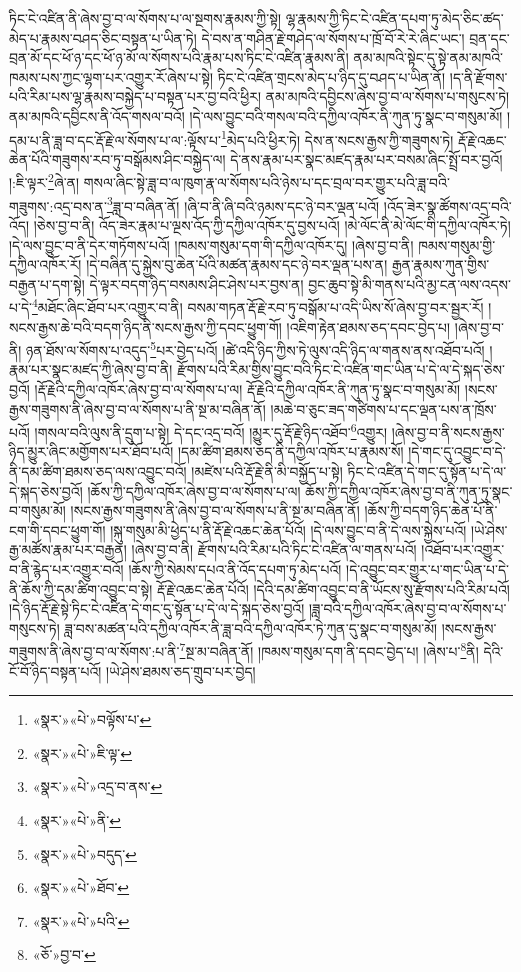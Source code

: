 ཏིང་ངེ་འཛིན་ནི་ཞེས་བྱ་བ་ལ་སོགས་པ་ལ་སྔགས་རྣམས་ཀྱི་སྟེ། ལྷ་རྣམས་ཀྱི་ཏིང་ངེ་འཛིན་དཔག་ཏུ་མེད་ཅིང་ཚད་མེད་པ་རྣམས་བཤད་ཅིང་བསྟན་པ་ཡིན་ཏེ། དེ་བས་ན་གཤིན་རྗེ་གཤེད་ལ་སོགས་པ་ཁྲོ་བོ་རེ་རེ་ཞིང་ཡང་། བྲན་དང་བྲན་མོ་དང་ཕོ་ཉ་དང་ཕོ་ཉ་མོ་ལ་སོགས་པའི་རྣམ་པས་ཏིང་ངེ་འཛིན་རྣམས་ནི། ནམ་མཁའི་སྟེང་དུ་སྟེ་ནམ་མཁའི་ཁམས་པས་ཀྱང་ལྷག་པར་འགྱུར་རོ་ཞེས་པ་སྟེ། ཏིང་ངེ་འཛིན་གྲངས་མེད་པ་ཉིད་དུ་བཤད་པ་ཡིན་ནོ། །ད་ནི་རྫོགས་པའི་རིམ་པས་ལྷ་རྣམས་བསྐྱེད་པ་བསྟན་པར་བྱ་བའི་ཕྱིར། ནམ་མཁའི་དབྱིངས་ཞེས་བྱ་བ་ལ་སོགས་པ་གསུངས་ཏེ། ནམ་མཁའི་དབྱིངས་ནི་འོད་གསལ་བའོ། །དེ་ལས་བྱུང་བའི་གསལ་བའི་དཀྱིལ་འཁོར་ནི་ཀུན་ཏུ་སྣང་བ་གསུམ་མོ། །དམ་པ་ནི་ཟླ་བ་དང་རྡོ་རྗེ་ལ་སོགས་པ་ལ་:ལྟོས་པ་\footnote{«སྣར་»«པེ་»བལྟོས་པ་}མེད་པའི་ཕྱིར་ཏེ། དེས་ན་སངས་རྒྱས་ཀྱི་གཟུགས་ཏེ། རྡོ་རྗེ་འཆང་ཆེན་པོའི་གཟུགས་རབ་ཏུ་བསྒོམས་ཤིང་བསྐྱེད་ལ། དེ་ནས་རྣམ་པར་སྣང་མཛད་རྣམ་པར་བསམ་ཞིང་སྤྲོ་བར་བྱའོ། །:ཇི་ལྟར་\footnote{«སྣར་»«པེ་»ཇི་ལྟ་}ཞེ་ན། གསལ་ཞིང་སྟེ་ཟླ་བ་ལ་ཁུག་རྣ་ལ་སོགས་པའི་ཉེས་པ་དང་བྲལ་བར་གྱུར་པའི་ཟླ་བའི་གཟུགས་:འདྲ་བས་ན་\footnote{«སྣར་»«པེ་»འདྲ་བ་ནས་}ཟླ་བ་བཞིན་ནོ། །ཞི་བ་ནི་ཞི་བའི་ཉམས་དང་ཉེ་བར་ལྡན་པའོ། །འོད་ཟེར་སྣ་ཚོགས་འདྲ་བའི་འོད། །ཅེས་བྱ་བ་ནི། འོད་ཟེར་རྣམ་པ་ལྔས་འོད་ཀྱི་དཀྱིལ་འཁོར་དུ་བྱས་པའོ། །མེ་ལོང་ནི་མེ་ལོང་གི་དཀྱིལ་འཁོར་ཏེ། །དེ་ལས་བྱུང་བ་ནི་དེར་གཏོགས་པའོ། །ཁམས་གསུམ་དག་གི་དཀྱིལ་འཁོར་དུ། །ཞེས་བྱ་བ་ནི། ཁམས་གསུམ་གྱི་དཀྱིལ་འཁོར་རོ། །དེ་བཞིན་དུ་སྐྱེས་བུ་ཆེན་པོའི་མཚན་རྣམས་དང་ཉེ་བར་ལྡན་པས་ན། རྒྱན་རྣམས་ཀུན་གྱིས་བརྒྱན་པ་དག་སྟེ། དེ་ལྟར་བདག་ཉིད་བསམས་ཤིང་ཤེས་པར་བྱས་ན། བྱང་ཆུབ་སྟེ་མི་གནས་པའི་མྱ་ངན་ལས་འདས་པ་དེ་\footnote{«སྣར་»«པེ་»ནི་}མཐོང་ཞིང་ཐོབ་པར་འགྱུར་བ་ནི། བསམ་གཏན་རྡོ་རྗེ་རབ་ཏུ་བསྒོམ་པ་འདི་ཡིས་སོ་ཞེས་བྱ་བར་སྦྱར་རོ། །སངས་རྒྱས་ཆེ་བའི་བདག་ཉིད་ནི་སངས་རྒྱས་ཀྱི་དབང་ཕྱུག་གོ། །འཇིག་རྟེན་ཐམས་ཅད་དབང་བྱེད་པ། །ཞེས་བྱ་བ་ནི། ཉན་ཐོས་ལ་སོགས་པ་འདུད་\footnote{«སྣར་»«པེ་»བདུད་}པར་བྱེད་པའོ། །ཚེ་འདི་ཉིད་ཀྱིས་ཏེ་ལུས་འདི་ཉིད་ལ་གནས་ནས་འཐོབ་པའོ། །རྣམ་པར་སྣང་མཛད་ཀྱི་ཞེས་བྱ་བ་ནི། རྫོགས་པའི་རིམ་གྱིས་བྱུང་བའི་ཏིང་ངེ་འཛིན་གང་ཡིན་པ་དེ་ལ་དེ་སྐད་ཅེས་བྱའོ། །རྡོ་རྗེའི་དཀྱིལ་འཁོར་ཞེས་བྱ་བ་ལ་སོགས་པ་ལ། རྡོ་རྗེའི་དཀྱིལ་འཁོར་ནི་ཀུན་ཏུ་སྣང་བ་གསུམ་མོ། །སངས་རྒྱས་གཟུགས་ནི་ཞེས་བྱ་བ་ལ་སོགས་པ་ནི་སྔ་མ་བཞིན་ནོ། །མཆེ་བ་ཅུང་ཟད་གཙིགས་པ་དང་ལྡན་པས་ན་ཁྲོས་པའོ། །གསལ་བའི་ལུས་ནི་དྲུག་པ་སྟེ། དེ་དང་འདྲ་བའོ། །མྱུར་དུ་རྡོ་རྗེ་ཉིད་འཐོབ་\footnote{«སྣར་»«པེ་»ཐོབ་}འགྱུར། །ཞེས་བྱ་བ་ནི་སངས་རྒྱས་ཉིད་མྱུར་ཞིང་མགྱོགས་པར་ཐོབ་པའོ། །དམ་ཚིག་ཐམས་ཅད་ནི་དཀྱིལ་འཁོར་པ་རྣམས་སོ། །དེ་གང་དུ་འབྱུང་བ་དེ་ནི་དམ་ཚིག་ཐམས་ཅད་ལས་འབྱུང་བའོ། །མཛེས་པའི་རྡོ་རྗེ་ནི་མི་བསྐྱོད་པ་སྟེ། ཏིང་ངེ་འཛིན་དེ་གང་དུ་སྟོན་པ་དེ་ལ་དེ་སྐད་ཅེས་བྱའོ། །ཆོས་ཀྱི་དཀྱིལ་འཁོར་ཞེས་བྱ་བ་ལ་སོགས་པ་ལ། ཆོས་ཀྱི་དཀྱིལ་འཁོར་ཞེས་བྱ་བ་ནི་ཀུན་ཏུ་སྣང་བ་གསུམ་མོ། །སངས་རྒྱས་གཟུགས་ནི་ཞེས་བྱ་བ་ལ་སོགས་པ་ནི་སྔ་མ་བཞིན་ནོ། །ཆོས་ཀྱི་བདག་ཉིད་ཆེན་པོ་ནི་ངག་གི་དབང་ཕྱུག་གོ། །སྐུ་གསུམ་མི་ཕྱེད་པ་ནི་རྡོ་རྗེ་འཆང་ཆེན་པོའོ། །དེ་ལས་བྱུང་བ་ནི་དེ་ལས་སྐྱེས་པའོ། །ཡེ་ཤེས་རྒྱ་མཚོས་རྣམ་པར་བརྒྱན། །ཞེས་བྱ་བ་ནི། རྫོགས་པའི་རིམ་པའི་ཏིང་ངེ་འཛིན་ལ་གནས་པའོ། །འཐོབ་པར་འགྱུར་བ་ནི་རྙེད་པར་འགྱུར་བའོ། །ཆོས་ཀྱི་སེམས་དཔའ་ནི་འོད་དཔག་ཏུ་མེད་པའོ། །དེ་འབྱུང་བར་གྱུར་པ་གང་ཡིན་པ་དེ་ནི་ཆོས་ཀྱི་དམ་ཚིག་འབྱུང་བ་སྟེ། རྡོ་རྗེ་འཆང་ཆེན་པོའོ། །དེའི་དམ་ཚིག་འབྱུང་བ་ནི་ཡོངས་སུ་རྫོགས་པའི་རིམ་པའོ། །དེ་ཉིད་རྡོ་རྗེ་སྟེ་ཏིང་ངེ་འཛིན་དེ་གང་དུ་སྟོན་པ་དེ་ལ་དེ་སྐད་ཅེས་བྱའོ། །ཟླ་བའི་དཀྱིལ་འཁོར་ཞེས་བྱ་བ་ལ་སོགས་པ་གསུངས་ཏེ། ཟླ་བས་མཚན་པའི་དཀྱིལ་འཁོར་ནི་ཟླ་བའི་དཀྱིལ་འཁོར་ཏེ་ཀུན་དུ་སྣང་བ་གསུམ་མོ། །སངས་རྒྱས་གཟུགས་ནི་ཞེས་བྱ་བ་ལ་སོགས་:པ་ནི་\footnote{«སྣར་»«པེ་»པའི་}སྔ་མ་བཞིན་ནོ། །ཁམས་གསུམ་དག་ནི་དབང་བྱེད་པ། །ཞེས་པ་\footnote{«ཅོ་»བྱ་བ་}ནི། དེའི་ངོ་བོ་ཉིད་བསྟན་པའོ། །ཡེ་ཤེས་ཐམས་ཅད་གྲུབ་པར་བྱེད། 